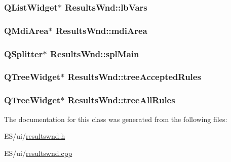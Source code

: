 \label{class_results_wnd_abf4afd833f509af7f3c93ea41ca93aa2}
\hypertarget{class_results_wnd_a5cfc059bfc3c05694c9a04dad6f867b5}{
\subsubsection[{lbVars}]{\setlength{\rightskip}{0pt plus 5cm}QListWidget$\ast$ {\bf ResultsWnd::lbVars}}}
\label{class_results_wnd_a5cfc059bfc3c05694c9a04dad6f867b5}
\hypertarget{class_results_wnd_a2ea2e38ff2d1cede2920eddc2206e7ab}{
\subsubsection[{mdiArea}]{\setlength{\rightskip}{0pt plus 5cm}QMdiArea$\ast$ {\bf ResultsWnd::mdiArea}}}
\label{class_results_wnd_a2ea2e38ff2d1cede2920eddc2206e7ab}
\hypertarget{class_results_wnd_a83475f5a6de9e7a383949156ada3ed33}{
\subsubsection[{splMain}]{\setlength{\rightskip}{0pt plus 5cm}QSplitter$\ast$ {\bf ResultsWnd::splMain}}}
\label{class_results_wnd_a83475f5a6de9e7a383949156ada3ed33}
\hypertarget{class_results_wnd_ab1ea5f39deb1c1ae3787be670f6d6429}{
\subsubsection[{treeAcceptedRules}]{\setlength{\rightskip}{0pt plus 5cm}QTreeWidget$\ast$ {\bf ResultsWnd::treeAcceptedRules}}}
\label{class_results_wnd_ab1ea5f39deb1c1ae3787be670f6d6429}
\hypertarget{class_results_wnd_ac9d2948e6951234621b4e18de6031580}{
\subsubsection[{treeAllRules}]{\setlength{\rightskip}{0pt plus 5cm}QTreeWidget$\ast$ {\bf ResultsWnd::treeAllRules}}}
\label{class_results_wnd_ac9d2948e6951234621b4e18de6031580}


The documentation for this class was generated from the following files:\begin{DoxyCompactItemize}
\item 
ES/ui/\hyperlink{resultswnd_8h}{resultswnd.h}\item 
ES/ui/\hyperlink{resultswnd_8cpp}{resultswnd.cpp}\end{DoxyCompactItemize}
